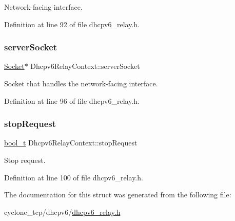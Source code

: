 Network-\/facing interface. 



Definition at line 92 of file dhcpv6\+\_\+relay.\+h.

\mbox{\label{structDhcpv6RelayContext_af1c015d0b8abef9419722312631a132d}} 
\subsubsection{\texorpdfstring{server\+Socket}{serverSocket}}
{\footnotesize\ttfamily \hyperlink{socket_8h_aa85acfb0fa336ef495e6ba87fb88fc48}{Socket}$\ast$ Dhcpv6\+Relay\+Context\+::server\+Socket}



Socket that handles the network-\/facing interface. 



Definition at line 96 of file dhcpv6\+\_\+relay.\+h.

\mbox{\label{structDhcpv6RelayContext_a6aacb68538ea15d3bd6be970a37ca5b6}} 
\subsubsection{\texorpdfstring{stop\+Request}{stopRequest}}
{\footnotesize\ttfamily \hyperlink{compiler__port_8h_a812d16e5494522586b3784e55d479912}{bool\+\_\+t} Dhcpv6\+Relay\+Context\+::stop\+Request}



Stop request. 



Definition at line 100 of file dhcpv6\+\_\+relay.\+h.



The documentation for this struct was generated from the following file\+:\begin{DoxyCompactItemize}
\item 
cyclone\+\_\+tcp/dhcpv6/\hyperlink{dhcpv6__relay_8h}{dhcpv6\+\_\+relay.\+h}\end{DoxyCompactItemize}
